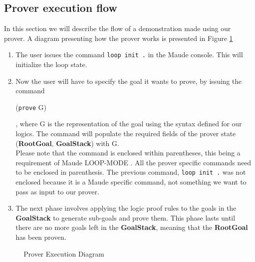 \documentclass[12pt,a4paper]{article}
\begin{document}
\subsection{Prover execution flow}
In this section we will describe the flow of a demonstration made using our prover. A diagram presenting how the prover works is presented in Figure \ref{fig:ProverDiagram}
\\
\begin{enumerate}
	\item The user issues the command \texttt{loop init .} in the Maude console. This will initialize the loop state.
	\item Now the user will have to specify the goal it wants to prove, by issuing the command \begin{center}(\texttt{prove} G)\end{center}, where G is the representation of the goal using the syntax defined for our logics. The command will populate the required fields of the prover state (\textbf{RootGoal}, \textbf{GoalStack}) with G.
	\\
	Please note that the command is enclosed within parentheses, this being a requirement of Maude LOOP-MODE \cite{manual}. All the prover specific commands need to be enclosed in parenthesis. The previous command, \texttt{loop init .} was not enclosed because it is a Maude specific command, not something we want to pass as input to our prover.
	\item The next phase involves applying the logic proof rules to the goals in the \textbf{GoalStack} to generate sub-goals and prove them. This phase lasts until there are no more goals left in the \textbf{GoalStack}, meaning that the \textbf{RootGoal} has been proven.
\end{enumerate}
\begin{figure}[h]
	\caption{Prover Execution Diagram}
	\label{fig:ProverDiagram}
\end{figure}
\end{document}
